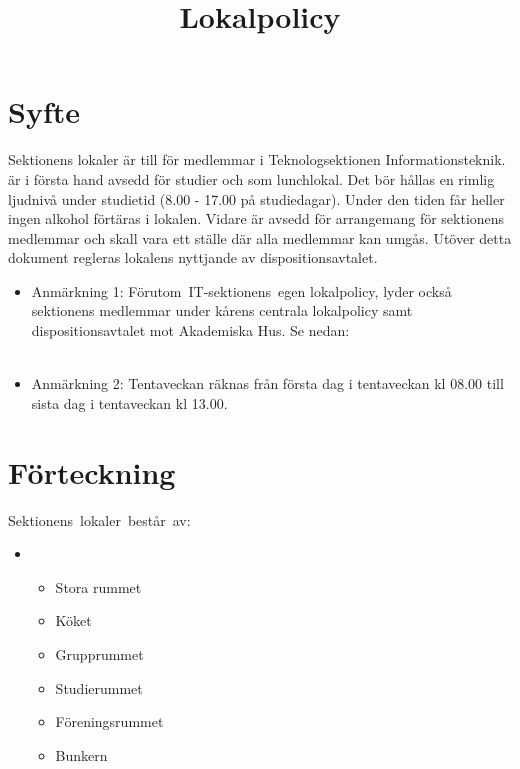 \documentclass[11pt, includeaddress]{../../classes/cthit}
\begin{document}
\title{Lokalpolicy}
\maketitle

\thispagestyle{empty}

\newpage

\makeheadfoot%

\setcounter{tocdepth}{2}
\setcounter{page}{1}
\tableofcontents

\newpage

\section{Syfte}
Sektionens lokaler är till för medlemmar i Teknologsektionen Informationsteknik.
\HUBBEN{} är i första hand avsedd för studier och som lunchlokal. Det bör hållas en rimlig ljudnivå under studietid (8.00 - 17.00 på studiedagar). Under den tiden får heller ingen alkohol förtäras i lokalen. Vidare är \HUBBEN{} avsedd för arrangemang för sektionens medlemmar och skall vara ett ställe där alla medlemmar kan umgås. Utöver detta dokument regleras lokalens nyttjande av dispositionsavtalet.

\begin{itemize}
	\item Anmärkning 1: Förutom IT­-sektionens egen lokalpolicy, lyder också sektionens medlemmar under kårens centrala lokalpolicy samt dispositionsavtalet mot Akademiska Hus. Se nedan: \\
	\\
	\item Anmärkning 2: Tentaveckan räknas från första dag i tentaveckan kl 08.00 till sista dag i tentaveckan kl 13.00. 
\end{itemize}


\section{Förteckning}
Sektionens lokaler består av:
\begin{itemize}  
  \item \HUBBEN{} 
  	\begin{itemize}  
	  \item Stora rummet
	  \item Köket
	  \item Grupprummet
	  \item Studierummet
	  \item Föreningsrummet
	  \item Bunkern
	\end{itemize}
\end{itemize}
\end{document}
